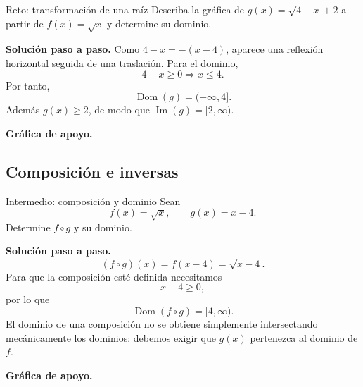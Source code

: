 \documentclass[aspectratio=169,10pt]{beamer}
\newcommand{\Dom}{\operatorname{Dom}}
\newcommand{\Ima}{\operatorname{Im}}
\begin{document}
\begin{frame}{Reto: transformación de una raíz}
Describa la gráfica de $g(x)=\sqrt{4-x}+2$ a partir de $f(x)=\sqrt{x}$ y determine su dominio.

\textbf{Solución paso a paso.} Como $4-x=-(x-4)$, aparece una reflexión horizontal seguida de una traslación. Para el dominio,
\[
4-x\ge0\Longrightarrow x\le4.
\]
Por tanto,
\[
\boxed{\Dom(g)=(-\infty,4]}.
\]
Además $g(x)\ge2$, de modo que $\Ima(g)=[2,\infty)$.


\textbf{Gráfica de apoyo.}\medskip
\begin{center}
\end{center}

\end{frame}

\subsection*{Composición e inversas}

\begin{frame}{Intermedio: composición y dominio}
Sean
\[
f(x)=\sqrt{x},\qquad g(x)=x-4.
\]
Determine $f\circ g$ y su dominio.

\textbf{Solución paso a paso.}
\[
(f\circ g)(x)=f(x-4)=\sqrt{x-4}.
\]
Para que la composición esté definida necesitamos
\[
x-4\ge0,
\]
por lo que
\[
\boxed{\Dom(f\circ g)=[4,\infty)}.
\]
El dominio de una composición no se obtiene simplemente intersectando mecánicamente los dominios: debemos exigir que $g(x)$ pertenezca al dominio de $f$.


\textbf{Gráfica de apoyo.}\medskip
\begin{center}
\end{center}

\end{frame}
\end{document}
